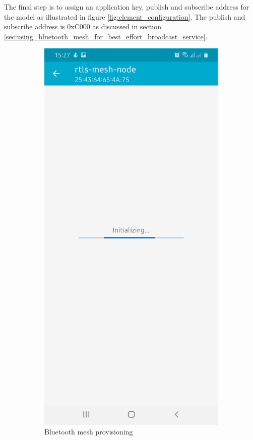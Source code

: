 \documentclass[\main/main.tex]{subfiles}
\begin{document}
The final step is to assign an application key, publish and subscribe address for the model as illustrated in figure \ref{fig:element_configuration}. The publish and subscribe address is 0xC000 as discussed in section \ref{sec:using_bluetooth_mesh_for_best_effort_broadcast_service}.

\begin{figure}[H]
    \centering
    \begin{subfigure}[b]{0.4\linewidth}
        \centering
        \includegraphics[width=0.65\linewidth]{nRF_Mesh_02.jpg}
        \caption{Bluetooth mesh provisioning}
    \end{subfigure}
    \begin{subfigure}[b]{0.4\linewidth}
        \centering

\end{subfigure}
\end{figure}
\end{document}
